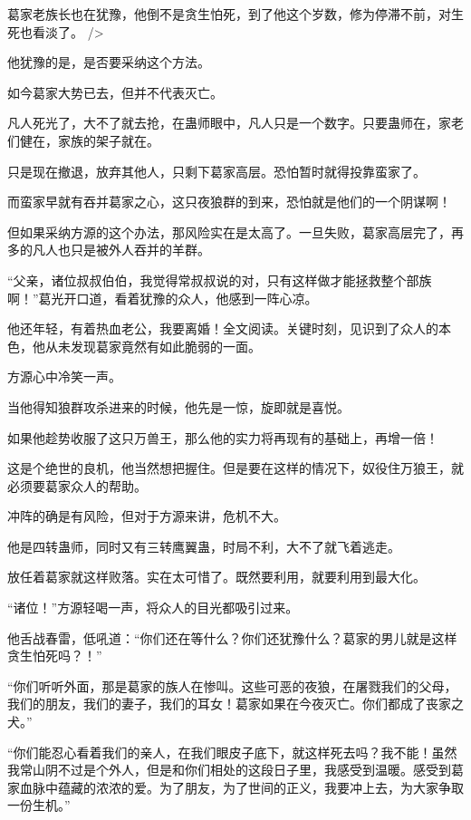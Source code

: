 
\begin{this_body}

葛家老族长也在犹豫，他倒不是贪生怕死，到了他这个岁数，修为停滞不前，对生死也看淡了。 />

他犹豫的是，是否要采纳这个方法。

如今葛家大势已去，但并不代表灭亡。

凡人死光了，大不了就去抢，在蛊师眼中，凡人只是一个数字。只要蛊师在，家老们健在，家族的架子就在。

只是现在撤退，放弃其他人，只剩下葛家高层。恐怕暂时就得投靠蛮家了。

而蛮家早就有吞并葛家之心，这只夜狼群的到来，恐怕就是他们的一个阴谋啊！

但如果采纳方源的这个办法，那风险实在是太高了。一旦失败，葛家高层完了，再多的凡人也只是被外人吞并的羊群。

“父亲，诸位叔叔伯伯，我觉得常叔叔说的对，只有这样做才能拯救整个部族啊！”葛光开口道，看着犹豫的众人，他感到一阵心凉。

他还年轻，有着热血老公，我要离婚！全文阅读。关键时刻，见识到了众人的本色，他从未发现葛家竟然有如此脆弱的一面。

方源心中冷笑一声。

当他得知狼群攻杀进来的时候，他先是一惊，旋即就是喜悦。

如果他趁势收服了这只万兽王，那么他的实力将再现有的基础上，再增一倍！

这是个绝世的良机，他当然想把握住。但是要在这样的情况下，奴役住万狼王，就必须要葛家众人的帮助。

冲阵的确是有风险，但对于方源来讲，危机不大。

他是四转蛊师，同时又有三转鹰翼蛊，时局不利，大不了就飞着逃走。

放任着葛家就这样败落。实在太可惜了。既然要利用，就要利用到最大化。

“诸位！”方源轻喝一声，将众人的目光都吸引过来。

他舌战春雷，低吼道：“你们还在等什么？你们还犹豫什么？葛家的男儿就是这样贪生怕死吗？！”

“你们听听外面，那是葛家的族人在惨叫。这些可恶的夜狼，在屠戮我们的父母，我们的朋友，我们的妻子，我们的耳女！葛家如果在今夜灭亡。你们都成了丧家之犬。”

“你们能忍心看着我们的亲人，在我们眼皮子底下，就这样死去吗？我不能！虽然我常山阴不过是个外人，但是和你们相处的这段日子里，我感受到温暖。感受到葛家血脉中蕴藏的浓浓的爱。为了朋友，为了世间的正义，我要冲上去，为大家争取一份生机。”


\end{this_body}
